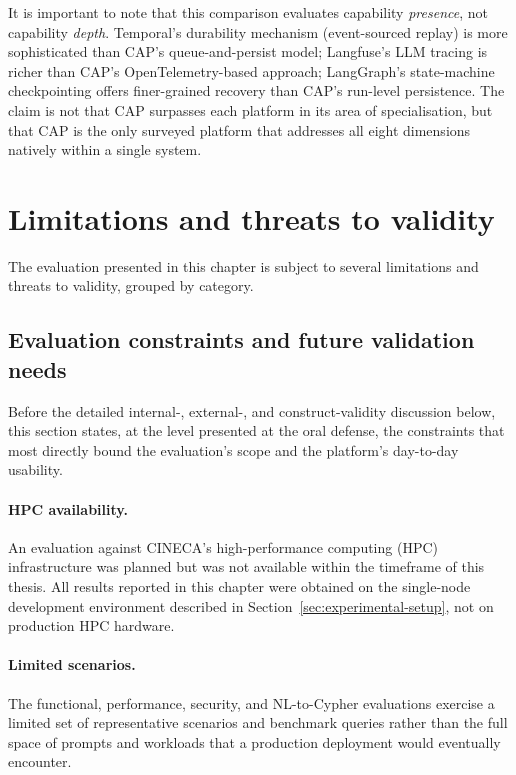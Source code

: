 \documentclass[a4paper,noexaminfo]{sapthesis}
\begin{document}
It is important to note that this comparison evaluates capability
\emph{presence}, not capability \emph{depth}.  Temporal's durability
mechanism (event-sourced replay) is more sophisticated than CAP's
queue-and-persist model; Langfuse's LLM tracing is richer than CAP's
OpenTelemetry-based approach; LangGraph's state-machine checkpointing
offers finer-grained recovery than CAP's run-level persistence.  The
claim is not that CAP surpasses each platform in its area of
specialisation, but that CAP is the only surveyed platform that
addresses all eight dimensions natively within a single system.


\section{Limitations and threats to validity}
\label{sec:limitations}

The evaluation presented in this chapter is subject to several
limitations and threats to validity, grouped by category.

\subsection{Evaluation constraints and future validation needs}
\label{sec:eval-constraints}

Before the detailed internal-, external-, and construct-validity
discussion below, this section states, at the level presented at the
oral defense, the constraints that most directly bound the evaluation's
scope and the platform's day-to-day usability.

\paragraph{HPC availability.}
An evaluation against CINECA's high-performance computing (HPC)
infrastructure was planned but was not available within the timeframe of
this thesis.  All results reported in this chapter were obtained on the
single-node development environment described in
Section~\ref{sec:experimental-setup}, not on production HPC hardware.

\paragraph{Limited scenarios.}
The functional, performance, security, and NL-to-Cypher evaluations
exercise a limited set of representative scenarios and benchmark
queries rather than the full space of prompts and workloads that a
production deployment would eventually encounter.
\end{document}
